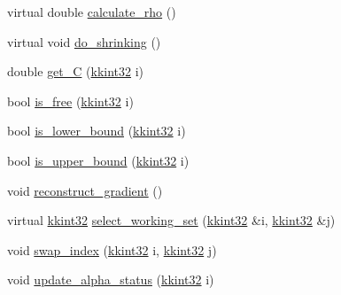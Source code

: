 \begin{DoxyCompactItemize}
\item 
virtual double \hyperlink{class_s_v_m289___m_f_s_1_1_solver_a147ed1d007cd7ce50f1e80cfe07c6c6c}{calculate\+\_\+rho} ()
\item 
virtual void \hyperlink{class_s_v_m289___m_f_s_1_1_solver_ad3f6665a1ca590e56b3d51f8ddcc347c}{do\+\_\+shrinking} ()
\item 
double \hyperlink{class_s_v_m289___m_f_s_1_1_solver_aaf5b54ead3cea36680337c5c577cb253}{get\+\_\+C} (\hyperlink{namespace_k_k_b_a8fa4952cc84fda1de4bec1fbdd8d5b1b}{kkint32} i)
\item 
bool \hyperlink{class_s_v_m289___m_f_s_1_1_solver_ac573d5e057697180eb9aa709af4c4d03}{is\+\_\+free} (\hyperlink{namespace_k_k_b_a8fa4952cc84fda1de4bec1fbdd8d5b1b}{kkint32} i)
\item 
bool \hyperlink{class_s_v_m289___m_f_s_1_1_solver_a2fe8c6cd332cef1fe1622fb6faa98e19}{is\+\_\+lower\+\_\+bound} (\hyperlink{namespace_k_k_b_a8fa4952cc84fda1de4bec1fbdd8d5b1b}{kkint32} i)
\item 
bool \hyperlink{class_s_v_m289___m_f_s_1_1_solver_a9648a7dd5e4e6818cdf255ffb1340187}{is\+\_\+upper\+\_\+bound} (\hyperlink{namespace_k_k_b_a8fa4952cc84fda1de4bec1fbdd8d5b1b}{kkint32} i)
\item 
void \hyperlink{class_s_v_m289___m_f_s_1_1_solver_a6699fc066ab4ce21abad8960db12e384}{reconstruct\+\_\+gradient} ()
\item 
virtual \hyperlink{namespace_k_k_b_a8fa4952cc84fda1de4bec1fbdd8d5b1b}{kkint32} \hyperlink{class_s_v_m289___m_f_s_1_1_solver_ac55972d3ad661215efd71b9f39aa432a}{select\+\_\+working\+\_\+set} (\hyperlink{namespace_k_k_b_a8fa4952cc84fda1de4bec1fbdd8d5b1b}{kkint32} \&i, \hyperlink{namespace_k_k_b_a8fa4952cc84fda1de4bec1fbdd8d5b1b}{kkint32} \&j)
\item 
void \hyperlink{class_s_v_m289___m_f_s_1_1_solver_a9cacfea262e4c4a3725cd0e70e864f37}{swap\+\_\+index} (\hyperlink{namespace_k_k_b_a8fa4952cc84fda1de4bec1fbdd8d5b1b}{kkint32} i, \hyperlink{namespace_k_k_b_a8fa4952cc84fda1de4bec1fbdd8d5b1b}{kkint32} j)
\item 
void \hyperlink{class_s_v_m289___m_f_s_1_1_solver_a0f685d5dd2aca0459f6a55dcef7f44c3}{update\+\_\+alpha\+\_\+status} (\hyperlink{namespace_k_k_b_a8fa4952cc84fda1de4bec1fbdd8d5b1b}{kkint32} i)
\end{DoxyCompactItemize}
